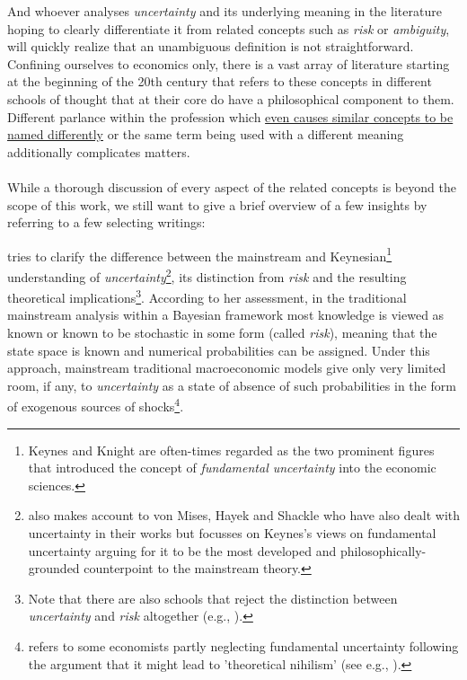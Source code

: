 \documentclass[a4paper,11pt,listof=nochaptergap,oneside,pointednumbers,bibtotoc,bigheadings,liststotoc,hidelinks]{scrbook}
\theoremstyle{mysatz}
\theoremstyle{mydefinition}
\theoremstyle{mytheorem}
\theoremstyle{mybemerkung}
\begin{document}
And whoever analyses \textit{uncertainty} and its underlying meaning in the literature hoping to clearly differentiate it from related concepts such as \textit{risk} or \textit{ambiguity}, will quickly realize that an unambiguous definition is not straightforward. Confining ourselves to economics only, there is a vast array of literature starting at the beginning of the 20th century that refers to these concepts in different schools of thought that at their core do have a philosophical component to them. Different parlance within the profession which \href{http://www.economics-ejournal.org/economics/discussionpapers/2015-36/file}{even causes similar concepts to be named differently} or the same term being used with a different meaning additionally complicates matters.\\
\\
While a thorough discussion of every aspect of the related concepts is beyond the scope of this work, we still want to give a brief overview of a few insights by referring to a few selecting writings:

\citet{dow:16} tries to clarify the difference between the mainstream and Keynesian\footnote{Keynes and Knight are often-times regarded as the two prominent figures that introduced the concept of \textit{fundamental uncertainty} into the economic sciences.} understanding of \textit{uncertainty}\footnote{\citet{dow:16} also makes account to von Mises, Hayek and Shackle who have also dealt with uncertainty in their works but focusses on Keynes's views on fundamental uncertainty arguing for it to be the most developed and philosophically-grounded counterpoint to the mainstream theory.}, its distinction from \textit{risk} and the resulting theoretical implications\footnote{Note that there are also schools that reject the distinction between \textit{uncertainty} and \textit{risk} altogether (e.g., \citealp{savage:54}).}. According to her assessment, in the traditional mainstream analysis within a Bayesian framework most knowledge is viewed as known or known to be stochastic in some form (called \textit{risk}), meaning that the state space is known and numerical probabilities can be assigned. Under this approach, mainstream traditional macroeconomic models give only very limited room, if any, to \textit{uncertainty} as a state of absence of such probabilities in the form of exogenous sources of shocks\footnote{\citet[p. 43]{dequesh:00} refers to some economists partly neglecting fundamental uncertainty following the argument that it might lead to 'theoretical nihilism' (see e.g., \citealp{coddington:82}).}.
\end{document}
